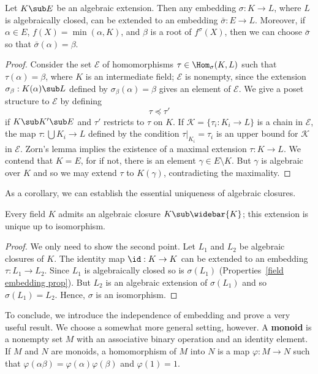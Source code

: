 \begin{theorem}\label{field embedding ext algebraic case}
Let $K\sub E$ be an algebraic extension. Then any embedding $\sigma:K\to L$, where $L$ is algebraically closed, can be extended to an embedding $\bar{\sigma}:E\to L$. Moreover, if $\alpha\in E$, $f(X)=\min(\alpha,K)$, and $\beta$ is a root of $f^\sigma(X)$, then we can choose $\bar{\sigma}$ so that $\bar{\sigma}(\alpha)=\beta$.
\end{theorem}
\begin{proof}
Consider the set $\mathcal{E}$ of homomorphisms $\tau\in\Hom_{\sigma}(K,L)$ such that $\tau(\alpha)=\beta$, where $K$ is an intermediate field; $\mathcal{E}$ is nonempty, since the extension $\sigma_\beta:K(\alpha)\sub L$ defined by $\sigma_\beta(\alpha)=\beta$ gives an element of $\mathcal{E}$. We give a poset structure to $\mathcal{E}$ by defining
\[\tau\preceq\tau'\]
if $K\sub K'\sub E$ and $\tau'$ restricts to $\tau$ on $K$. If $\mathcal{K}=\{\tau_i:K_i\to L\}$ is a chain in $\mathcal{E}$, the map $\tau:\bigcup K_i\to L$ defined by the condition $\tau|_{K_i}=\tau_i$ is an upper bound for $\mathcal{K}$ in $\mathcal{E}$. Zorn's lemma implies the existence of a maximal extension $\tau:K\to L$. We contend that $K=E$, for if not, there is an element $\gamma\in E\setminus K$. But $\gamma$ is algebraic over $K$ and so we may extend $\tau$ to $K(\gamma)$, contradicting the maximality.
\end{proof}
As a corollary, we can establish the essential uniqueness of algebraic closures.
\begin{theorem}\label{field algebraic closure unique}
Every field $K$ admits an algebraic closure $K\sub\widebar{K}$; this extension is unique up to isomorphism.
\end{theorem}
\begin{proof}
We only need to show the second point. Let $L_1$ and $L_2$ be algebraic closures of $K$. The identity map $\id:K\to K$ can be extended to an embedding $\tau:L_1\to L_2$. Since $L_1$ is algebraically closed so is $\sigma(L_1)$ (Properties~\ref{field embedding prop}). But $L_2$ is an algebraic extension of $\sigma(L_1)$ and so $\sigma(L_1)=L_2$. Hence, $\sigma$ is an isomorphism.
\end{proof}
To conclude, we introduce the independence of embedding and prove a very useful result. We choose a somewhat more general setting, however. A \textbf{monoid} is a nonempty set $M$ with an associative binary operation and an identity element. If $M$ and $N$ are monoids, a homomorphism of $M$ into $N$ is a map $\varphi:M\to N$ such that $\varphi(\alpha\beta)=\varphi(\alpha)\varphi(\beta)$ and $\varphi(1)=1$.
